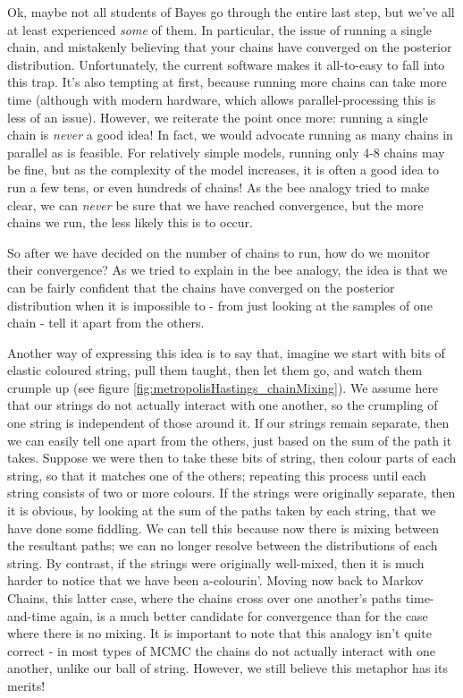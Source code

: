 \documentclass[11pt,fullpage]{book}
\begin{document}
Ok, maybe not all students of Bayes go through the entire last step, but we've all at least experienced \textit{some} of them. In particular, the issue of running a single chain, and mistakenly believing that your chains have converged on the posterior distribution. Unfortunately, the current software makes it all-to-easy to fall into this trap. It's also tempting at first, because running more chains can take more time (although with modern hardware, which allows parallel-processing this is less of an issue). However, we reiterate the point once more: running a single chain is \textit{never} a good idea! In fact, we would advocate running as many chains in parallel as is feasible. For relatively simple models, running only 4-8 chains may be fine, but as the complexity of the model increases, it is often a good idea to run a few tens, or even hundreds of chains! As the bee analogy tried to make clear, we can \textit{never} be sure that we have reached convergence, but the more chains we run, the less likely this is to occur.

So after we have decided on the number of chains to run, how do we monitor their convergence? As we tried to explain in the bee analogy, the idea is that we can be fairly confident that the chains have converged on the posterior distribution when it is impossible to - from just looking at the samples of one chain - tell it apart from the others. 

Another way of expressing this idea is to say that, imagine we start with bits of elastic coloured string, pull them taught, then let them go, and watch them crumple up (see figure \ref{fig:metropolisHastings_chainMixing}). We assume here that our strings do not actually interact with one another, so the crumpling of one string is independent of those around it. If our strings remain separate, then we can easily tell one apart from the others, just based on the sum of the path it takes. Suppose we were then to take these bits of string, then colour parts of each string, so that it matches one of the others; repeating this process until each string consists of two or more colours. If the strings were originally separate, then it is obvious, by looking at the sum of the paths taken by each string, that we have done some fiddling. We can tell this because now there is mixing between the resultant paths; we can no longer resolve between the distributions of each string. By contrast, if the strings were originally well-mixed, then it is much harder to notice that we have been a-colourin'. Moving now back to Markov Chains, this latter case, where the chains cross over one another's paths time-and-time again, is a much better candidate for convergence than for the case where there is no mixing. It is important to note that this analogy isn't quite correct - in most types of MCMC the chains do not actually interact with one another, unlike our ball of string. However, we still believe this metaphor has its merits!
\end{document}

